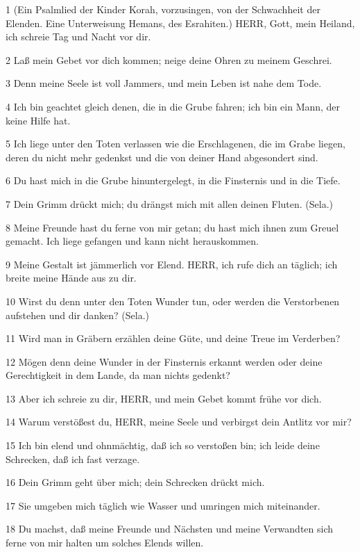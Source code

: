 \par 1 (Ein Psalmlied der Kinder Korah, vorzusingen, von der Schwachheit der Elenden. Eine Unterweisung Hemans, des Esrahiten.) HERR, Gott, mein Heiland, ich schreie Tag und Nacht vor dir.
\par 2 Laß mein Gebet vor dich kommen; neige deine Ohren zu meinem Geschrei.
\par 3 Denn meine Seele ist voll Jammers, und mein Leben ist nahe dem Tode.
\par 4 Ich bin geachtet gleich denen, die in die Grube fahren; ich bin ein Mann, der keine Hilfe hat.
\par 5 Ich liege unter den Toten verlassen wie die Erschlagenen, die im Grabe liegen, deren du nicht mehr gedenkst und die von deiner Hand abgesondert sind.
\par 6 Du hast mich in die Grube hinuntergelegt, in die Finsternis und in die Tiefe.
\par 7 Dein Grimm drückt mich; du drängst mich mit allen deinen Fluten. (Sela.)
\par 8 Meine Freunde hast du ferne von mir getan; du hast mich ihnen zum Greuel gemacht. Ich liege gefangen und kann nicht herauskommen.
\par 9 Meine Gestalt ist jämmerlich vor Elend. HERR, ich rufe dich an täglich; ich breite meine Hände aus zu dir.
\par 10 Wirst du denn unter den Toten Wunder tun, oder werden die Verstorbenen aufstehen und dir danken? (Sela.)
\par 11 Wird man in Gräbern erzählen deine Güte, und deine Treue im Verderben?
\par 12 Mögen denn deine Wunder in der Finsternis erkannt werden oder deine Gerechtigkeit in dem Lande, da man nichts gedenkt?
\par 13 Aber ich schreie zu dir, HERR, und mein Gebet kommt frühe vor dich.
\par 14 Warum verstößest du, HERR, meine Seele und verbirgst dein Antlitz vor mir?
\par 15 Ich bin elend und ohnmächtig, daß ich so verstoßen bin; ich leide deine Schrecken, daß ich fast verzage.
\par 16 Dein Grimm geht über mich; dein Schrecken drückt mich.
\par 17 Sie umgeben mich täglich wie Wasser und umringen mich miteinander.
\par 18 Du machst, daß meine Freunde und Nächsten und meine Verwandten sich ferne von mir halten um solches Elends willen.

